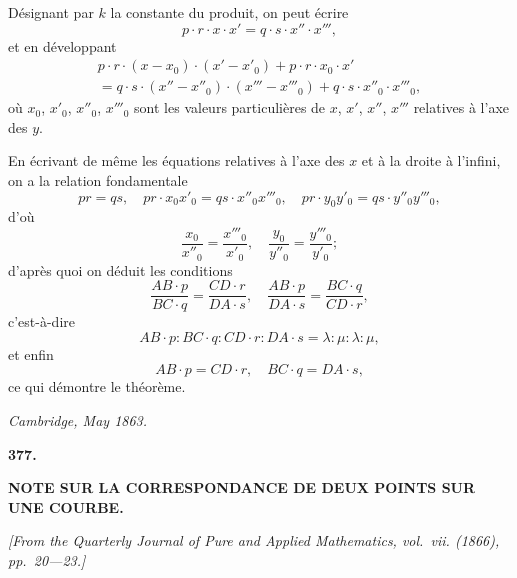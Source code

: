\documentclass[11pt,a4paper]{article}
\begin{document}
D\'{e}signant par $k$ la constante du produit, on peut \'{e}crire
\[
p \cdot r \cdot x \cdot x' = q \cdot s \cdot x'' \cdot x''',
\]
et en d\'{e}veloppant
\begin{multline*}
p \cdot r \cdot (x - x_{0}) \cdot (x' - x'_{0}) + p \cdot r \cdot x_{0} \cdot x'\\
= q \cdot s \cdot (x'' - x''_{0}) \cdot (x''' - x'''_{0}) + q \cdot s \cdot x''_{0} \cdot x'''_{0},
\end{multline*}
o\`{u} $x_{0}$, $x'_{0}$, $x''_{0}$, $x'''_{0}$ sont les valeurs particuli\`{e}res de $x$, $x'$, $x''$, $x'''$ relatives \`{a} l'axe des $y$.

En \'{e}crivant de m\^{e}me les \'{e}quations relatives \`{a} l'axe des $x$ et \`{a} la droite \`{a} l'infini, on a la relation fondamentale
\[
pr = qs,\quad pr \cdot x_{0}x'_{0} = qs \cdot x''_{0}x'''_{0},\quad pr \cdot y_{0}y'_{0} = qs \cdot y''_{0}y'''_{0},
\]
d'o\`{u}
\[
\frac{x_{0}}{x''_{0}} = \frac{x'''_{0}}{x'_{0}},\quad \frac{y_{0}}{y''_{0}} = \frac{y'''_{0}}{y'_{0}};
\]
d'apr\`{e}s quoi on d\'{e}duit les conditions
\[
\frac{AB \cdot p}{BC \cdot q} = \frac{CD \cdot r}{DA \cdot s},\quad \frac{AB \cdot p}{DA \cdot s} = \frac{BC \cdot q}{CD \cdot r},
\]
c'est-\`{a}-dire
\[
AB \cdot p : BC \cdot q : CD \cdot r : DA \cdot s = \lambda : \mu : \lambda : \mu,
\]
et enfin
\[
AB \cdot p = CD \cdot r,\quad BC \cdot q = DA \cdot s,
\]
ce qui d\'{e}montre le th\'{e}or\`{e}me.

\begin{flushright}
\textit{Cambridge, May 1863.}
\end{flushright}

\vspace{24pt}


\newpage
\begin{center}
\textbf{377.}
\end{center}
\vspace{-8pt}

\begin{center}
\textbf{NOTE SUR LA CORRESPONDANCE DE DEUX POINTS SUR UNE COURBE.}
\end{center}

\begin{flushright}
\small\textit{[From the Quarterly Journal of Pure and Applied Mathematics, vol.~vii. (1866), pp.~20---23.]}
\end{flushright}
\end{document}
